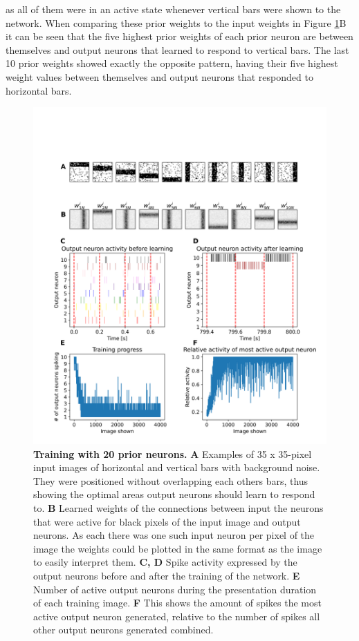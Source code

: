 as all of them were in an active state whenever vertical bars were shown to the network. When comparing these prior weights to the input weights in Figure \ref{fig:horvertAdaptiveInhibitionTraining}B it can be seen that the five highest prior weights of each prior neuron are between themselves and output neurons that learned to respond to vertical bars. The last 10 prior weights showed exactly the opposite pattern, having their five highest weight values between themselves and output neurons that responded to horizontal bars.

\begin{figure}
  \includegraphics[width=\linewidth]{figures/horvertAdaptiveInh/trainingPlot.png}
  \caption{\textbf{Training with 20 prior neurons.} \textbf{A} Examples of 35 x 35-pixel input images of horizontal and vertical bars with background noise. They were positioned without overlapping each others bars, thus showing the optimal areas output neurons should learn to respond to. \textbf{B} Learned weights of the connections between input the neurons that were active for black pixels of the input image and output neurons. As each there was one such input neuron per pixel of the image the weights could be plotted in the same format as the image to easily interpret them. \textbf{C, D} Spike activity expressed by the output neurons before and after the training of the network. \textbf{E} Number of active output neurons during the presentation duration of each training image. \textbf{F} This shows the amount of spikes the most active output neuron generated, relative to the number of spikes all other output neurons generated combined. }
  \label{fig:horvertAdaptiveInhibitionTraining}
\end{figure}

